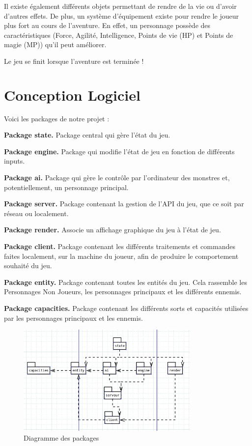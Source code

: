 \documentclass[12pt,a4paper]{report}
\begin{document}
Il existe \'{e}galement diff\'{e}rents objets permettant de rendre de la vie ou d'avoir d'autres effets. De plus, un système d'\'{e}quipement existe pour rendre le joueur plus fort au cours de l'aventure. En effet, un personnage possède des caract\'{e}ristiques (Force, Agilit\'{e}, Intelligence, Points de vie (HP) et Points de magie (MP)) qu'il peut am\'{e}liorer.

Le jeu se finit lorsque l'aventure est termin\'{e}e !
\section{Conception Logiciel}

Voici les packages de notre projet :

\textbf{Package state.} Package central qui gère l'\'{e}tat du jeu.

\textbf{Package engine.} Package qui modifie l'\'{e}tat de jeu en fonction de diff\'{e}rents inputs.

\textbf{Package ai.} Package qui gère le contrôle par l'ordinateur des monstres et, potentiellement, un personnage principal.

\textbf{Package server.} Package contenant la gestion de l'API du jeu, que ce soit par r\'{e}seau ou localement.

\textbf{Package render.} Associe un affichage graphique du jeu à l'\'{e}tat de jeu.

\textbf{Package client.} Package contenant les diff\'{e}rents traitements et commandes faites localement, sur la machine du joueur, afin de produire le comportement souhait\'{e} du jeu.

\textbf{Package entity.} Package contenant toutes les entit\'{e}s du jeu. Cela rassemble les Personnages Non Joueurs, les personnages principaux et les diff\'{e}rents ennemis.

\textbf{Package capacities.} Package contenant les diff\'{e}rents sorts et capacit\'{e}s utilis\'{e}es par les personnages principaux et les ennemis.

\begin{figure}
\caption{Diagramme des packages}
\includegraphics[width=0.80\textwidth]{lol.jpg}
\end{figure}
\end{document}
